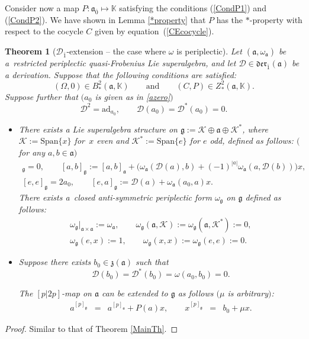 \documentclass[pdftex]{sigma}
\numberwithin{equation}{section}
\newtheorem{Theorem}{Theorem}[section]
\begin{document}
Consider now a map $P\colon \mathfrak{a}_{\bar 0} \mapsto \mathbb{K}$
satisfying the conditions (\ref{CondP1}) and (\ref{CondP2}). We have shown in Lemma \ref{*property} that $P$ has the $*$-property with respect to the cocycle $C$ given by equation~(\ref{CEcocycle}).
\begin{Theorem}[${\mathscr D}_{\bar 1}$-extension -- the case where $\omega$ is periplectic]\label{MainThOO} Let $(\mathfrak{a}, \omega_\mathfrak{a})$ be a~restricted periplectic quasi-Frobenius Lie superalgebra, and let ${\mathscr D}\in \mathfrak{der}_{\bar 1}(\mathfrak{a})$ be a derivation. Suppose that the following conditions are satisfied:
\[
(\Omega, 0) \in B^2_*(\mathfrak{a}, \mathbb{K}) \qquad \text{and} \qquad (C, P) \in Z^2_*(\mathfrak{a}, \mathbb{K}).
\]
Suppose further that $(a_0$ is given as in \eqref{azero}$)$
\[
{\mathscr D}^2=\mathrm{ad}_{a_0}, \qquad {\mathscr D}(a_0)={\mathscr D}^*(a_0)=0.
\]
\begin{itemize}
\item[$(i)$] There exists a Lie superalgebra structure on $\mathfrak{g}:=\mathscr{K} \oplus \mathfrak{a} \oplus \mathscr{K} ^*$, where $\mathscr{K} :=\mathrm{Span}\{x\}$ for~$x$ even and $\mathscr{K}^* :=\mathrm{Span}\{e\}$ for $e$ odd, defined as follows: $($for any $a, b\in \mathfrak{a})$
\begin{gather*}
[\mathscr{K} ,\mathfrak{g}]_\mathfrak{g}=0, \qquad [a,b]_\mathfrak{g} := [a,b]_\mathfrak{a} + \bigl(\omega_\mathfrak{a}( {\mathscr D}(a), b) +(-1)^{|a|}\omega_\mathfrak{a}(a, {\mathscr D}(b))\bigr)x, \\
[e, e]_\mathfrak{g}=2 a_0, \qquad [e,a]_\mathfrak{g} := {\mathscr D}(a) + \omega_\mathfrak{a}(a_0,a)x.
\end{gather*}
There exists a~closed anti-symmetric periplectic form $\omega_\mathfrak{g}$ on $\mathfrak{g}$ defined as follows:
\begin{gather*}
{\omega_\mathfrak{g}}\vert_{\mathfrak{a} \times \mathfrak{a}}:= \omega_\mathfrak{a}, \qquad \omega_\mathfrak{g}(\mathfrak{a},\mathscr{K} ):=\omega_\mathfrak{g}(\mathfrak{a},\mathscr{K} ^*):=0, \\ \omega_\mathfrak{g}(e,x):=1, \qquad
\omega_\mathfrak{g}(x,x):=\omega_\mathfrak{g}(e,e) :=0.
\end{gather*}
\item[$(ii)$] Suppose there exists $b_0\in \mathfrak{z}(\mathfrak{a})$ such that
\[
{\mathscr D}(b_0)={\mathscr D}^*(b_0)=\omega (a_0, b_0)=0.
\]


The $[p|2p]$-map on $\mathfrak{a}$ can be extended to $\mathfrak{g}$ as follows $(\mu$ is arbitrary$)$:
\[
\begin{array}{lcllcl}
a^{[p]_\mathfrak{g}} & = & a^{[p]_\mathfrak{a}} +P(a)x, \qquad
x^{[p]_\mathfrak{g}} & =& b_0+\mu x.
\end{array}
\]
\end{itemize}
\end{Theorem}
\begin{proof}
Similar to that of Theorem \ref{MainTh}.
\end{proof}
\end{document}
